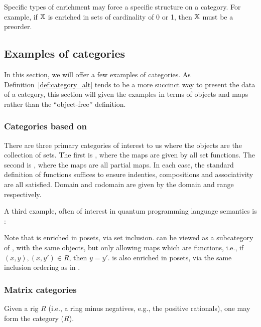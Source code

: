 Specific types of enrichment may force a specific structure on a category. For example, if $\mathbb{X}$ is
enriched in sets of cardinality of 0 or 1, then $\mathbb{X}$ must be a preorder. 
\subsection{Examples of categories} %
\label{sub:examples_of_categories}
In this section, we will offer a few examples of categories. As Definition~\ref{def:category_alt} 
tends to be a more succinct way to present the data of a category, this section will given the
examples in terms of objects and maps rather than the ``object-free'' definition.


\subsubsection{Categories based on \protect{\sets}} %
\label{ssub:categories_based_on_sets}
There are three primary categories of interest to us where the objects are the collection of sets.
The first is \sets, where the maps are given by all set functions. The second is \Par, where the maps
are all partial maps. In each case, the standard definition of functions suffices to ensure indenties,
compositions and associativity are all satisfied. Domain and codomain are given by the domain and range
respectively.  

A third example, often of interest in quantum programming language semantics is \rel:

Note that \rel is enriched in posets, via set inclusion. \Par can be viewed as a subcategory of
\rel, with the same objects, but only allowing maps which are functions, i.e., if $(x,y), (x,y')
\in R$, then $y = y'$. \Par is also enriched in posets, via the same inclusion ordering as in \rel.

\subsubsection{Matrix categories} %
\label{ssub:matrix_categories}
Given a rig $R$ (i.e., a ring minus negatives, e.g., the positive rationals), one may form the category
($R$).

